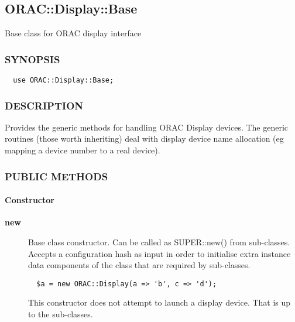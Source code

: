 \subsection{ORAC::Display::Base\label{ORAC::Display::Base}}


Base class for ORAC display interface

\subsubsection*{SYNOPSIS\label{ORAC::Display::Base_SYNOPSIS}}
\begin{verbatim}
  use ORAC::Display::Base;
\end{verbatim}
\subsubsection*{DESCRIPTION\label{ORAC::Display::Base_DESCRIPTION}}


Provides the generic methods for handling ORAC Display devices.
The generic routines (those worth inheriting) deal with display
device name allocation (eg mapping a device number to a real device).

\subsubsection*{PUBLIC METHODS\label{ORAC::Display::Base_PUBLIC_METHODS}}
\paragraph*{Constructor\label{ORAC::Display::Base_Constructor}}
\begin{description}

\item[{\textbf{new}}] \mbox{}

Base class constructor. Can be called as SUPER::new() from
sub-classes. Accepts a configuration hash as input in order to
initialise extra instance data components of the class that are
required by sub-classes.

\begin{verbatim}
  $a = new ORAC::Display(a => 'b', c => 'd');
\end{verbatim}


This constructor does not attempt to launch a display device.
That is up to the sub-classes.

\end{description}
